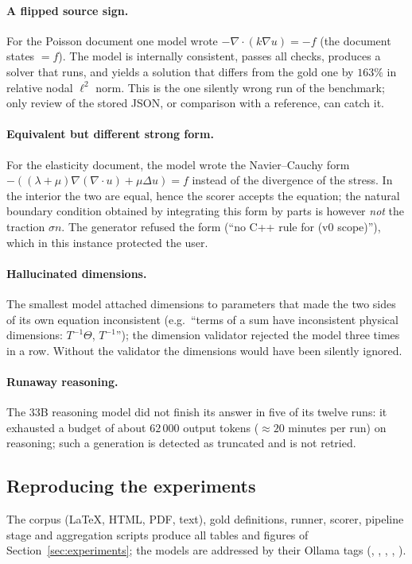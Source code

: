 \paragraph{A flipped source sign.} For the Poisson document one model wrote $-\nabla\cdot(k\nabla u)=-f$ (the document states $=f$). The model is internally consistent, passes all checks, produces a solver that runs, and yields a solution that differs from the gold one by $163\%$ in relative nodal $\ell^2$ norm. This is the one silently wrong run of the benchmark; only review of the stored JSON, or comparison with a reference, can catch it.

\paragraph{Equivalent but different strong form.} For the elasticity document, the model wrote the Navier--Cauchy form $-((\lambda+\mu)\nabla(\nabla\cdot u)+\mu\Delta u)=f$ instead of the divergence of the stress. In the interior the two are equal, hence the scorer accepts the equation; the natural boundary condition obtained by integrating this form by parts is however \emph{not} the traction $\sigma n$. The generator refused the form (``no C++ rule for  (v0 scope)''), which in this instance protected the user.

\paragraph{Hallucinated dimensions.} The smallest model attached dimensions to parameters that made the two sides of its own equation inconsistent (e.g.\ ``terms of a sum have inconsistent physical dimensions: $T^{-1}\Theta$, $T^{-1}$''); the dimension validator rejected the model three times in a row. Without the validator the dimensions would have been silently ignored.

\paragraph{Runaway reasoning.} The 33B reasoning model did not finish its answer in five of its twelve runs: it exhausted a budget of about $62\,000$ output tokens ($\approx20$ minutes per run) on reasoning; such a generation is detected as truncated and is not retried.

\subsection{Reproducing the experiments}
The corpus (LaTeX, HTML, PDF, text), gold definitions, runner, scorer, pipeline stage and aggregation scripts produce all tables and figures of Section~\ref{sec:experiments}; the models are addressed by their Ollama tags (, , , , ).
